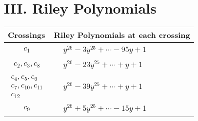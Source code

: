 \documentclass[1p]{elsarticle_modified}
\theoremstyle{definition}
\begin{document}
\centering \section*{ III. Riley Polynomials}
\begin{tabular}{m{50pt}|m{274pt}}
Crossings & \hspace{64pt}Riley Polynomials at each crossing \\
\hline $$\begin{aligned}c_{1}\end{aligned}$$&$\begin{aligned}
&y^{26}-3 y^{25}+\cdots-95 y+1
\end{aligned}$\\
\hline $$\begin{aligned}c_{2},c_{3},c_{8}\end{aligned}$$&$\begin{aligned}
&y^{26}-23 y^{25}+\cdots+y+1
\end{aligned}$\\
\hline $$\begin{aligned}c_{4},c_{5},c_{6}\\c_{7},c_{10},c_{11}\\c_{12}\end{aligned}$$&$\begin{aligned}
&y^{26}-39 y^{25}+\cdots+y+1
\end{aligned}$\\
\hline $$\begin{aligned}c_{9}\end{aligned}$$&$\begin{aligned}
&y^{26}+5 y^{25}+\cdots-15 y+1
\end{aligned}$\\
\hline
\end{tabular}
\vskip 2pc
\end{document}
